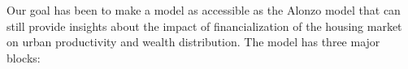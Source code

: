 











Our goal has been to make a model as accessible as the Alonzo model that can still provide insights about  the impact of financialization of the housing market on urban productivity and wealth distribution.  The  model has three major blocks:

